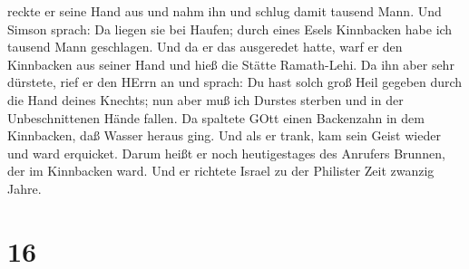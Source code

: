 reckte er seine Hand aus und nahm ihn und schlug damit tausend Mann.
 Und Simson sprach: Da liegen sie bei Haufen; durch eines
Esels Kinnbacken habe ich tausend Mann geschlagen.  Und da
er das ausgeredet hatte, warf er den Kinnbacken aus seiner Hand und hieß
die Stätte Ramath-Lehi.  Da ihn aber sehr dürstete, rief er
den HErrn an und sprach: Du hast solch groß Heil gegeben durch die Hand
deines Knechts; nun aber muß ich Durstes sterben und in der
Unbeschnittenen Hände fallen.  Da spaltete GOtt einen
Backenzahn in dem Kinnbacken, daß Wasser heraus ging. Und als er trank,
kam sein Geist wieder und ward erquicket. Darum heißt er noch
heutigestages des Anrufers Brunnen, der im Kinnbacken ward.
 Und er richtete Israel zu der Philister Zeit zwanzig
Jahre.

\hypertarget{section-15}{%
\section{16}\label{section-15}}

